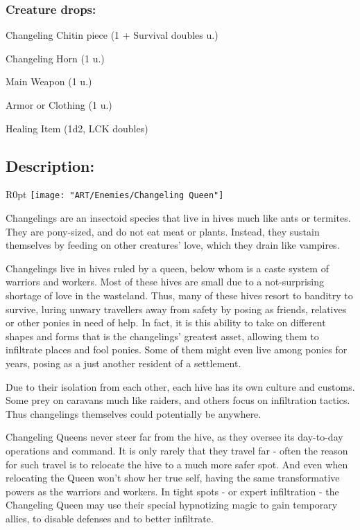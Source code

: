 \documentclass[11pt,a4paper,twocolumn]{book}
\begin{document}
	\subsubsection*{Creature drops:}
	\begin{compactitem}
		\item Changeling Chitin piece (1 + Survival doubles u.)
		\item Changeling Horn (1 u.)
		\item Main Weapon (1 u.)
		\item Armor or Clothing (1 u.)
		\item Healing Item (1d2, LCK doubles)
	\end{compactitem}
	
	\subsection*{Description:}
	
	\begin{wrapfigure}{R}{0pt}
		\texttt{[image: "ART/Enemies/Changeling Queen"]}
	\end{wrapfigure}
	
	Changelings are an insectoid species that live in hives much like ants or termites. They are pony-sized, and do not eat meat or plants. Instead, they sustain themselves by feeding on other creatures' love, which they drain like vampires.
	
	Changelings live in hives ruled by a queen, below whom is a caste system of warriors and workers. Most of these hives are small due to a not-surprising shortage of love in the wasteland. Thus, many of these hives resort to banditry to survive, luring unwary travellers away from safety by posing as friends, relatives or other ponies in need of help. In fact, it is this ability to take on different shapes and forms that is the changelings' greatest asset, allowing them to infiltrate places and fool ponies. Some of them might even live among ponies for years, posing as a just another resident of a settlement.
	
	Due to their isolation from each other, each hive has its own culture and customs. Some prey on caravans much like raiders, and others focus on infiltration tactics. Thus changelings themselves could potentially be anywhere.
	
	\bigskip
	Changeling Queens never steer far from the hive, as they oversee its day-to-day operations and command. It is only rarely that they travel far - often the reason for such travel is to relocate the hive to a much more safer spot. And even when relocating the Queen won't show her true self, having the same transformative powers as the warriors and workers. In tight spots - or expert infiltration - the Changeling Queen may use their special hypnotizing magic to gain temporary allies, to disable defenses and to better infiltrate.
	
\end{document}
